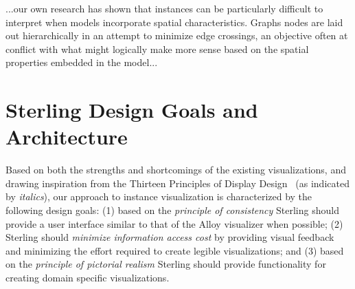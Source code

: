 \documentclass[runningheads]{llncs}
\begin{document}
...our own research has shown that instances can be particularly difficult to interpret when models incorporate spatial characteristics. Graphs nodes are laid out hierarchically in an attempt to minimize edge crossings, an objective often at conflict with what might logically make more sense based on the spatial properties embedded in the model...

\section{Sterling Design Goals and Architecture}
\label{sterling}

Based on both the strengths and shortcomings of the existing visualizations, and drawing inspiration from the Thirteen Principles of Display Design~\cite{wickens2003} (as indicated by \emph{italics}), our approach to instance visualization is characterized by the following design goals: (1) based on the \emph{principle of consistency} Sterling should provide a user interface similar to that of the Alloy visualizer when possible; (2) Sterling should \emph{minimize information access cost} by providing visual feedback and minimizing the effort required to create legible visualizations; and (3) based on the \emph{principle of pictorial realism} Sterling should provide functionality for creating domain specific visualizations.


\end{document}
